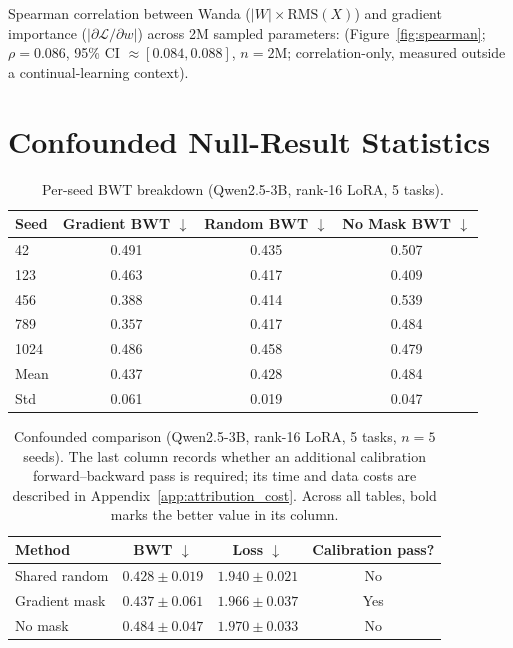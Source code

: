 Spearman correlation between Wanda ($|W| \times \text{RMS}(X)$) and gradient importance ($|\partial \mathcal{L}/\partial w|$) across 2M sampled parameters: (Figure~\ref{fig:spearman}; $\rho = 0.086$, 95\% CI $\approx [0.084, 0.088]$, $n{=}2$M; correlation-only, measured outside a continual-learning context).

\section{Confounded Null-Result Statistics}
\label{app:null_stats}

\begin{table}[h]
\caption{Per-seed BWT breakdown (Qwen2.5-3B, rank-16 LoRA, 5 tasks).}
\label{tab:per_seed}
\centering
\small
\begin{tabular}{@{}lccc@{}}
\toprule
\textbf{Seed} & \textbf{Gradient BWT $\downarrow$} & \textbf{Random BWT $\downarrow$} & \textbf{No Mask BWT $\downarrow$} \\
\midrule
42  & 0.491 & 0.435 & 0.507 \\
123 & 0.463 & 0.417 & $\mathbf{0.409}$ \\
456 & $\mathbf{0.388}$ & 0.414 & 0.539 \\
789 & $\mathbf{0.357}$ & 0.417 & 0.484 \\
1024 & 0.486 & 0.458 & 0.479 \\
\midrule
Mean & 0.437 & $\mathbf{0.428}$ & 0.484 \\
Std  & 0.061 & 0.019 & 0.047 \\
\bottomrule
\end{tabular}
\end{table}

\begin{table}[h]
\caption{Confounded comparison (Qwen2.5-3B, rank-16 LoRA, 5 tasks, $n{=}5$ seeds). The last column records whether an additional calibration forward--backward pass is required; its time and data costs are described in Appendix~\ref{app:attribution_cost}. Across all tables, bold marks the better value in its column.}
\label{tab:cl_3b}
\centering
\small
\begin{tabular}{@{}lccc@{}}
\toprule
\textbf{Method} & \textbf{BWT $\downarrow$} & \textbf{Loss $\downarrow$} & \textbf{Calibration pass?} \\
\midrule
Shared random & $\mathbf{0.428} \pm 0.019$ & $\mathbf{1.940} \pm 0.021$ & No \\
Gradient mask & $0.437 \pm 0.061$ & $1.966 \pm 0.037$ & Yes \\
No mask & $0.484 \pm 0.047$ & $1.970 \pm 0.033$ & No \\
\bottomrule
\end{tabular}
\end{table}


